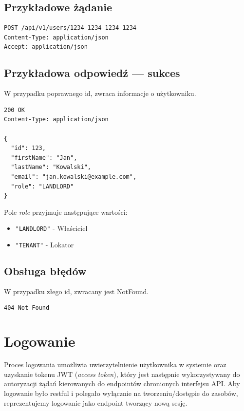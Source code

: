 \documentclass[11pt, a4paper]{article}
\begin{document}
\subsection{Przykładowe żądanie}

\begin{lstlisting}[style=http,caption={Przykładowe żądanie rejestracji}]
POST /api/v1/users/1234-1234-1234-1234
Content-Type: application/json
Accept: application/json
\end{lstlisting}

\subsection{Przykładowa odpowiedź — sukces}

W przypadku poprawnego id, zwraca informacje o użytkowniku.

\begin{lstlisting}[style=http,caption={Odpowiedź HTTP — sukces}]
200 OK
Content-Type: application/json

{
  "id": 123,
  "firstName": "Jan",
  "lastName": "Kowalski",
  "email": "jan.kowalski@example.com",
  "role": "LANDLORD"
}
\end{lstlisting}

Pole \textit{role} przyjmuje następujące wartości:
\begin{itemize}
  \item \texttt{"LANDLORD"} - Właściciel
  \item \texttt{"TENANT"} - Lokator
\end{itemize}

\subsection{Obsługa błędów}

W przypadku złego id, zwracany jest NotFound.

\begin{lstlisting}[style=http,caption={Odpowiedź HTTP — nieudana rejestracja}]
404 Not Found
\end{lstlisting}

\section{Logowanie}

Proces logowania umożliwia uwierzytelnienie użytkownika w systemie oraz uzyskanie
tokenu JWT (\textit{access token}), który jest następnie wykorzystywany do
autoryzacji żądań kierowanych do endpointów chronionych interfejsu API. Aby logowanie było restful i polegało wyłącznie na tworzeniu/dostępie do zasobów, reprezentujemy logowanie jako endpoint tworzący nową sesję. 
\end{document}
